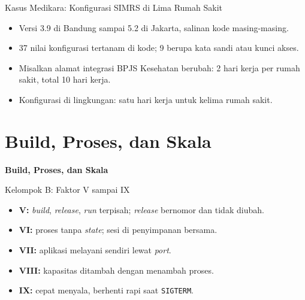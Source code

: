 \documentclass[aspectratio=169, table, 12pt]{beamer}
\begin{document}
\begin{frame}{{\Large Kasus Medikara: Konfigurasi SIMRS di Lima Rumah Sakit}}
  \vspace{10pt}
  \begin{itemize}
    \item Versi 3.9 di Bandung sampai 5.2 di Jakarta, salinan kode masing-masing.
    \item 37 nilai konfigurasi tertanam di kode; 9 berupa kata sandi atau kunci
          akses.
    \item Misalkan alamat integrasi BPJS Kesehatan berubah: 2 hari kerja per rumah
          sakit, total 10 hari kerja.
    \item Konfigurasi di lingkungan: satu hari kerja untuk kelima rumah sakit.
  \end{itemize}
\end{frame}

\section{Build, Proses, dan Skala}

\begin{frame}{\hfill}
  \centering
  \Huge{\textbf{Build, Proses, dan Skala}}
\end{frame}

\begin{frame}{{\Large Kelompok B: Faktor V sampai IX}}
  \vspace{10pt}
  \begin{itemize}
    \item \textbf{V:} \textit{build}, \textit{release}, \textit{run} terpisah;
          \textit{release} bernomor dan tidak diubah.
    \item \textbf{VI:} proses tanpa \textit{state}; sesi di penyimpanan bersama.
    \item \textbf{VII:} aplikasi melayani sendiri lewat \textit{port}.
    \item \textbf{VIII:} kapasitas ditambah dengan menambah proses.
    \item \textbf{IX:} cepat menyala, berhenti rapi saat \texttt{SIGTERM}.
  \end{itemize}
\end{frame}
\end{document}
